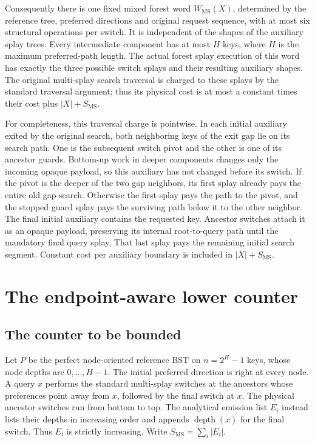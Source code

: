 \documentclass[11pt]{article}
\numberwithin{equation}{section}
\newcommand{\MS}{\mathrm{MS}}
\newcommand{\dep}{\operatorname{depth}}
\begin{document}
Consequently there is one fixed mixed forest word $W_{\MS}(X)$,
determined by the reference tree, preferred directions and original
request sequence, with at most six structural operations per switch.
It is independent of the shapes of the auxiliary splay trees. Every
intermediate component has at most $H$ keys, where $H$ is the maximum
preferred-path length. The actual forest splay execution of this word
has exactly the three possible switch splays and their resulting
auxiliary shapes. The original multi-splay search traversal is charged
to these splays by the standard traversal argument; thus its physical
cost is at most a constant times their cost plus $|X|+S_{\MS}$.

For completeness, this traversal charge is pointwise. In each initial
auxiliary exited by the original search, both neighboring keys of the
exit gap lie on its search path. One is the subsequent switch pivot
and the other is one of its ancestor guards. Bottom-up work in deeper
components changes only the incoming opaque payload, so this auxiliary
has not changed before its switch. If the pivot is the deeper of the
two gap neighbors, its first splay already pays the entire old gap
search. Otherwise the first splay pays the path to the pivot, and the
stopped guard splay pays the surviving path below it to the other
neighbor. The final initial auxiliary contains the requested key.
Ancestor switches attach it as an opaque payload, preserving its
internal root-to-query path until the mandatory final query splay.
That last splay pays the remaining initial search segment. Constant
cost per auxiliary boundary is included in $|X|+S_{\MS}$.


\section{The endpoint-aware lower counter}\label{sec:endpoint}
\subsection{The counter to be bounded}

Let $P$ be the perfect node-oriented reference BST on
$n=2^H-1$ keys, whose node depths are $0,\ldots,H-1$.
The initial preferred direction is right at every node. A query $x$
performs the standard multi-splay switches at the ancestors whose
preferences point away from $x$, followed by the final switch at $x$.
The physical ancestor switches run from bottom to top. The analytical
emission list $E_i$ instead lists their depths in increasing order and
appends $\dep(x)$ for the final switch. Thus $E_i$ is strictly increasing.
Write $S_{\MS}=\sum_i|E_i|$.
\end{document}
